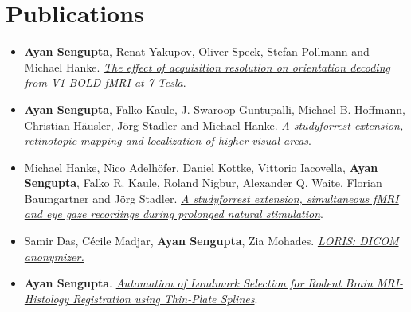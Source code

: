 \documentclass[line, margin]{res}
\begin{document}
\begin{resume}
\begin{itemize}
 
\end{itemize}




\section{Publications}
\begin{itemize}
    \item \textbf{Ayan Sengupta}, Renat Yakupov, Oliver Speck, Stefan Pollmann and Michael Hanke. \href{http://www.sciencedirect.com/science/article/pii/S1053811916307625}{\textit{The effect of acquisition resolution on orientation decoding from V1 BOLD fMRI at 7 Tesla}}.\\
    \item \textbf{Ayan Sengupta}, Falko Kaule, J. Swaroop Guntupalli, Michael B. Hoffmann, Christian H\"{a}usler, J\"{o}rg Stadler and Michael Hanke. \href{http://www.nature.com/articles/sdata201693}{\textit{A studyforrest extension, retinotopic mapping and localization of higher visual areas}}.\\
    \item Michael Hanke,  Nico Adelh\"{o}fer, Daniel Kottke, Vittorio Iacovella, \textbf{Ayan Sengupta}, Falko R. Kaule, Roland Nigbur, Alexander Q. Waite, Florian Baumgartner and J\"{o}rg Stadler. \href{http://www.nature.com/articles/sdata201692}{\textit{A studyforrest extension, simultaneous fMRI and eye gaze recordings during prolonged natural stimulation}}.\\
	\item Samir Das, C\'{e}cile Madjar, \textbf{Ayan Sengupta}, Zia Mohades. \href{https://www.ncbi.nlm.nih.gov/pmc/articles/PMC5103253}{\textit{LORIS: DICOM anonymizer.}}\\
	\item \textbf{Ayan Sengupta}. \href{http://digitalcommons.unl.edu/computerscidiss/45/}{\textit{Automation of Landmark Selection for Rodent Brain MRI-Histology Registration using Thin-Plate Splines}}.\\
\end{itemize}






\end{resume}
\end{document}
